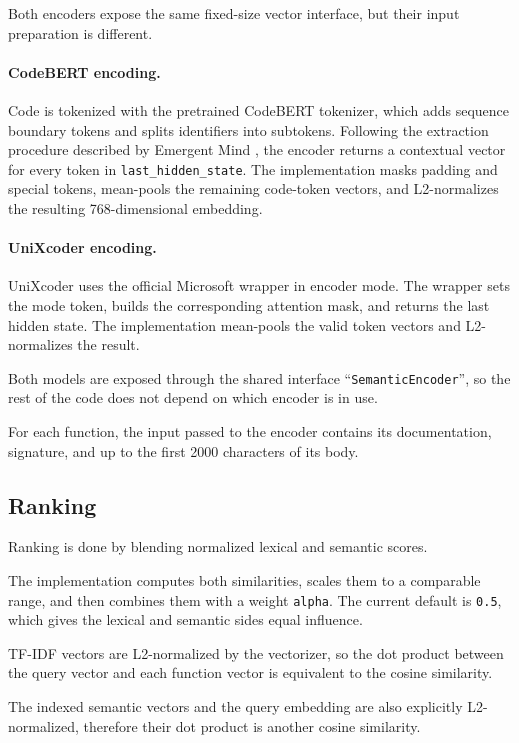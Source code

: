 \documentclass[12pt]{article}
\begin{document}
Both encoders expose the same fixed-size vector interface, but their input preparation is different.

\paragraph{CodeBERT encoding.}
Code is tokenized with the pretrained CodeBERT tokenizer, which adds sequence boundary tokens and splits identifiers into subtokens.
Following the extraction procedure described by Emergent Mind \cite{emergentmindcodebertembeddings}, the encoder returns a contextual vector for every token in \texttt{last\_hidden\_state}.
The implementation masks padding and special tokens, mean-pools the remaining code-token vectors, and L2-normalizes the resulting 768-dimensional embedding.

\paragraph{UniXcoder encoding.}
UniXcoder uses the official Microsoft wrapper in encoder mode. The wrapper sets the mode token, builds the corresponding attention mask, and returns the last hidden state.
The implementation mean-pools the valid token vectors and L2-normalizes the result.

\bigskip
Both models are exposed through the shared interface ``\texttt{SemanticEncoder}'', so the rest of the code does not depend on which encoder is in use.

For each function, the input passed to the encoder contains its documentation, signature, and up to the first 2000 characters of its body.

\subsection{Ranking}
\label{subsec:ranking}

Ranking is done by blending normalized lexical and semantic scores.

The implementation computes both similarities, scales them to a comparable range, and then combines them with a weight \texttt{alpha}.
The current default is \texttt{0.5}, which gives the lexical and semantic sides equal influence.

TF-IDF vectors are L2-normalized by the vectorizer, so the dot product between the query vector and each function vector is equivalent to the cosine similarity.

\noindent
The indexed semantic vectors and the query embedding are also explicitly L2-normalized, therefore their dot product is another cosine similarity.
\end{document}
